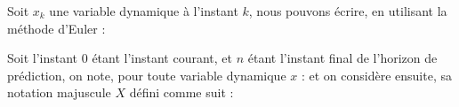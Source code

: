 			Soit $x_k$ une variable dynamique à l'instant $k$, nous pouvons écrire, en utilisant la méthode d'Euler :
			
			Soit l'instant $0$ étant l'instant courant, et $n$ étant l'instant final de l'horizon de prédiction, on note, pour toute variable dynamique $x$ :
			et on considère ensuite, sa notation majuscule $X$ défini comme suit :
			
